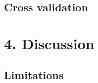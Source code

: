 \documentclass[11pt,]{article}
\begin{document}
\subsection{Cross validation}\label{cross-validation-1}

\section{4. Discussion}\label{discussion}

\subsection{Limitations}\label{limitations}
\end{document}
